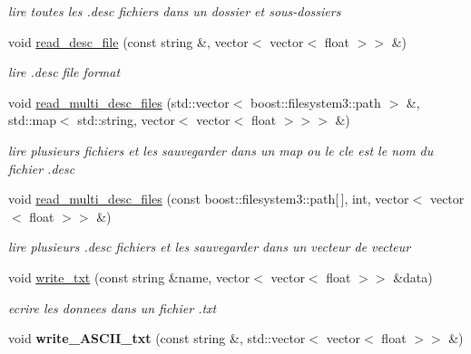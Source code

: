 \begin{DoxyCompactItemize}
\begin{DoxyCompactList}\small\item\em lire toutes les .desc fichiers dans un dossier et sous-\/dossiers \end{DoxyCompactList}\item 
\hypertarget{class_fichiers_abd361f128106da90ce9f233545924620}{
void \hyperlink{class_fichiers_abd361f128106da90ce9f233545924620}{read\_\-desc\_\-file} (const string \&, vector$<$ vector$<$ float $>$$>$ \&)}
\label{class_fichiers_abd361f128106da90ce9f233545924620}

\begin{DoxyCompactList}\small\item\em lire .desc file format \end{DoxyCompactList}\item 
\hypertarget{class_fichiers_a3f62ac28cd9707397c10ae7cc0a352e4}{
void \hyperlink{class_fichiers_a3f62ac28cd9707397c10ae7cc0a352e4}{read\_\-multi\_\-desc\_\-files} (std::vector$<$ boost::filesystem3::path $>$ \&, std::map$<$ std::string, vector$<$ vector$<$ float $>$$>$$>$ \&)}
\label{class_fichiers_a3f62ac28cd9707397c10ae7cc0a352e4}

\begin{DoxyCompactList}\small\item\em lire plusieurs fichiers et les sauvegarder dans un map ou le cle est le nom du fichier .desc \end{DoxyCompactList}\item 
\hypertarget{class_fichiers_ad71c50923605164c6af579dc4229414d}{
void \hyperlink{class_fichiers_ad71c50923605164c6af579dc4229414d}{read\_\-multi\_\-desc\_\-files} (const boost::filesystem3::path\mbox{[}$\,$\mbox{]}, int, vector$<$ vector$<$ float $>$$>$ \&)}
\label{class_fichiers_ad71c50923605164c6af579dc4229414d}

\begin{DoxyCompactList}\small\item\em lire plusieurs .desc fichiers et les sauvegarder dans un vecteur de vecteur \end{DoxyCompactList}\item 
\hypertarget{class_fichiers_a4a6e86f729b280b7c86a71a77b45eb8e}{
void \hyperlink{class_fichiers_a4a6e86f729b280b7c86a71a77b45eb8e}{write\_\-txt} (const string \&name, vector$<$ vector$<$ float $>$$>$ \&data)}
\label{class_fichiers_a4a6e86f729b280b7c86a71a77b45eb8e}

\begin{DoxyCompactList}\small\item\em ecrire les donnees dans un fichier .txt \end{DoxyCompactList}\item 
\hypertarget{class_fichiers_aa9e09727e5946224efd16ed3dc11f4a3}{
void {\bfseries write\_\-ASCII\_\-txt} (const string \&, std::vector$<$ vector$<$ float $>$$>$ \&)}
\label{class_fichiers_aa9e09727e5946224efd16ed3dc11f4a3}


\end{DoxyCompactItemize}
